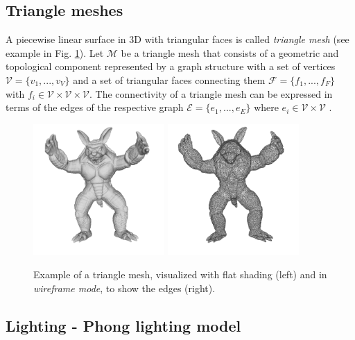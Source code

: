 \subsection{Triangle meshes}
A piecewise linear surface in 3D with triangular faces is called \textit{triangle mesh} (see example in Fig. \ref{fig:mesh-3d-armadillo}). Let $\mathcal{M}$ be a triangle mesh that consists of a geometric and topological component represented by a graph structure with a set of vertices $\mathcal{V} = \{ v_1, ..., v_V \}$ and a set of triangular faces connecting them $\mathcal{F} = \{ f_1, ... , f_F \}$ with $f_i \in \mathcal{V} \times \mathcal{V} \times \mathcal{V}$. The connectivity of a triangle mesh can be expressed in terms of the edges of the respective graph $\mathcal{E} = \{ e_1, ..., e_E \}$ where $e_i \in \mathcal{V} \times \mathcal{V}$ \cite{polygonmeshprocessing}.
\begin{figure}[h!]
  \centering
  \centering
  \includegraphics[width=5cm]{images/armadillo-white04}
  \endminipage
  \centering
  \centering
  \includegraphics[width=5cm]{images/armadillo-white205}
  \endminipage
\caption{Example of a triangle mesh, visualized with flat shading (left) and in \emph{wireframe mode}, to show the edges (right).}\label{fig:mesh-3d-armadillo}
\end{figure}


\subsection{Lighting - Phong lighting model}

